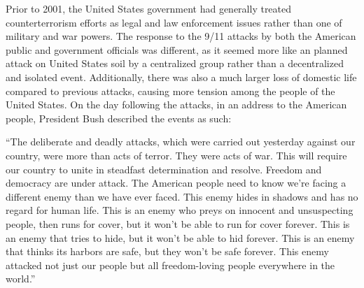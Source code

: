 \documentclass[12pt]{article}
\begin{document}
Prior to 2001, the United States government had generally treated counterterrorism efforts as legal and law enforcement issues rather than one of military and war powers.
The response to the 9/11 attacks by both the American public and government officials was different, as it seemed more like an planned attack on United States soil by a centralized group rather than a decentralized and isolated event.
Additionally, there was also a much larger loss of domestic life compared to previous attacks, causing more tension among the people of the United States.
On the day following the attacks, in an address to the American people, President Bush described the events as such:

\begin{displayquote}
``The deliberate and deadly attacks, which were carried out yesterday against our country, were more than acts of terror. They were acts of war. This will require our country to unite in steadfast determination and resolve. Freedom and democracy are under attack. The American people need to know we're facing a different enemy than we have ever faced. This enemy hides in shadows and has no regard for human life. This is an enemy who preys on innocent and unsuspecting people, then runs for cover, but it won't be able to run for cover forever. This is an enemy that tries to hide, but it won't be able to hid forever. This is an enemy that thinks its harbors are safe, but they won't be safe forever. This enemy attacked not just our people but all freedom-loving people everywhere in the world.'' \autocite{bush2001}
\end{displayquote}
\end{document}
